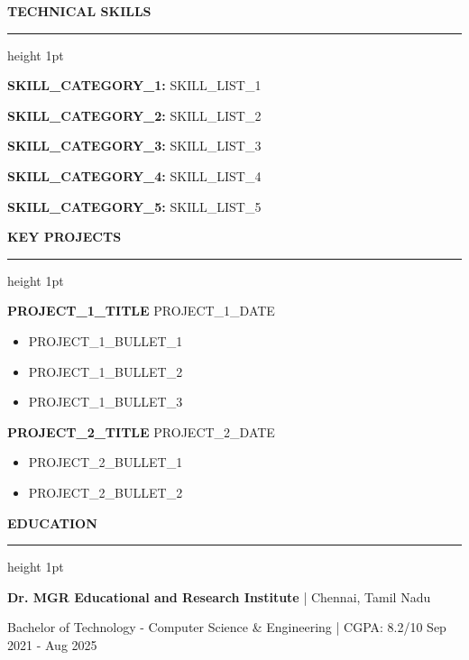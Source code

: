 \documentclass[11pt,a4paper,sans]{article}
\newcommand{\resumesection}[1]{%
    \vspace{8pt}
    {\large\bfseries\color{headercolor}#1}
    \vspace{2pt}
    \hrule height 1pt
    \vspace{6pt}
}
\newcommand{\projectentry}[2]{%
    \textbf{#1} \hfill #2\\
    \vspace{2pt}
}
\begin{document}

\resumesection{TECHNICAL SKILLS}

\textbf{{{SKILL_CATEGORY_1}}:} {{SKILL_LIST_1}}

\vspace{4pt}

\textbf{{{SKILL_CATEGORY_2}}:} {{SKILL_LIST_2}}

\vspace{4pt}

\textbf{{{SKILL_CATEGORY_3}}:} {{SKILL_LIST_3}}

\vspace{4pt}

\textbf{{{SKILL_CATEGORY_4}}:} {{SKILL_LIST_4}}

\vspace{4pt}

\textbf{{{SKILL_CATEGORY_5}}:} {{SKILL_LIST_5}}


\resumesection{KEY PROJECTS}

\projectentry{{{PROJECT_1_TITLE}}}{{{PROJECT_1_DATE}}}

\begin{itemize}
    \item {{PROJECT_1_BULLET_1}}
    \item {{PROJECT_1_BULLET_2}}
    \item {{PROJECT_1_BULLET_3}}
\end{itemize}

\vspace{6pt}

\projectentry{{{PROJECT_2_TITLE}}}{{{PROJECT_2_DATE}}}

\begin{itemize}
    \item {{PROJECT_2_BULLET_1}}
    \item {{PROJECT_2_BULLET_2}}
\end{itemize}


\resumesection{EDUCATION}

\textbf{Dr. MGR Educational and Research Institute} | Chennai, Tamil Nadu

Bachelor of Technology - Computer Science \& Engineering | CGPA: 8.2/10 \hfill Sep 2021 - Aug 2025
\end{document}
